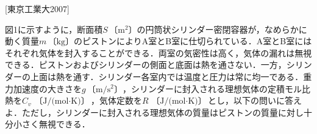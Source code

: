 


\noindent
{} [東京工業大2007]

図1に示すように，断面積$S \,\text{〔m${}^2$〕}$の円筒状シリンダー密閉容器が，なめらかに動く質量$m\,\text{〔kg〕}$のピストンによりA室とB室に仕切られている．A室とB室にはそれぞれ気体を封入することができる．両室の気密性は高く，気体の漏れは無視できる．ピストンおよびシリンダーの側面と底面は熱を通さない．一方，シリンダーの上面は熱を通す．シリンダー各室内では温度と圧力は常に均一である．重力加速度の大きさを$g\, \text{〔m/s${}^2$〕}$，シリンダーに封入される理想気体の定積モル比熱を$C_v\, \text{〔J/(mol$\cdot$K)〕}$，気体定数を$R\, \text{〔J/(mol$\cdot$K)〕}$とし，以下の問いに答えよ．ただし，シリンダーに封入される理想気体の質量はピストンの質量に対し十分小さく無視できる．

